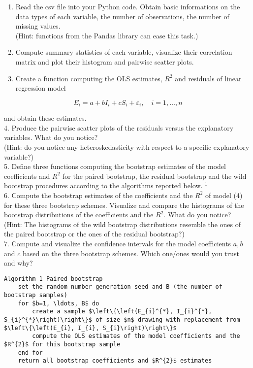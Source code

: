 \begin{enumerate}
  \item Read the csv file into your Python code. Obtain basic informations on the data types of each variable, the number of observations, the number of missing values.\\
(Hint: functions from the Pandas library can ease this task.)
  \item Compute summary statistics of each variable, visualize their correlation matrix and plot their histogram and pairwise scatter plots.
  \item Create a function computing the OLS estimates, $R^{2}$ and residuals of linear regression model
\end{enumerate}


\begin{equation}
E_{i}=a+b I_{i}+c S_{i}+\varepsilon_{i}, \quad i=1, \ldots, n \label{eq:Ei}
\end{equation}


and obtain these estimates.\\
4. Produce the pairwise scatter plots of the residuals versus the explanatory variables. What do you notice?\\
(Hint: do you notice any heteroskedasticity with respect to a specific explanatory variable?)\\
5. Define three functions computing the bootstrap estimates of the model coefficients and $R^{2}$ for the paired bootstrap, the residual bootstrap and the wild bootstrap procedures according to the algorithms reported below. ${ }^{1}$\\
6. Compute the bootstrap estimates of the coefficients and the $R^{2}$ of model (4) for these three bootstrap schemes. Visualize and compare the histograms of the bootstrap distributions of the coefficients and the $R^{2}$. What do you notice?\\
(Hint: The histograms of the wild bootstrap distributions resemble the ones of the paired bootstrap or the ones of the residual bootstrap?)\\
7. Compute and visualize the confidence intervals for the model coefficients $a, b$ and $c$ based on the three bootstrap schemes. Which one/ones would you trust and why?

\begin{verbatim}
Algorithm 1 Paired bootstrap
    set the random number generation seed and B (the number of bootstrap samples)
    for $b=1, \ldots, B$ do
        create a sample $\left\{\left(E_{i}^{*}, I_{i}^{*}, S_{i}^{*}\right)\right\}$ of size $n$ drawing with replacement from $\left\{\left(E_{i}, I_{i}, S_{i}\right)\right\}$
        compute the OLS estimates of the model coefficients and the $R^{2}$ for this bootstrap sample
    end for
    return all bootstrap coefficients and $R^{2}$ estimates
\end{verbatim}

